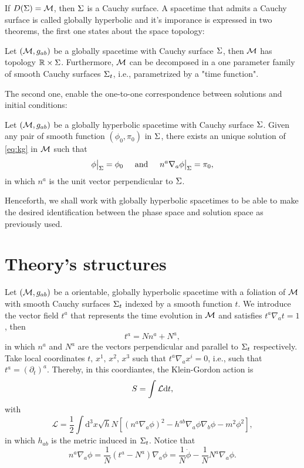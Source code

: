 If \(D(\Sigma)={\mathcal{M}}\), then \(\Sigma\) is a Cauchy surface. A spacetime that admits a Cauchy surface is called globally hyperbolic and it's imporance is expressed in two theorems, the first one states about the space topology:
\begin{theorem}
    Let \(({\mathcal{M}},g_{ab})\) be a globally spacetime with Cauchy surface \(\Sigma\), then \({\mathcal{M}}\) has topology \({\mathbb{R}}\times\Sigma\). Furthermore, \({\mathcal{M}}\) can be decomposed in a one parameter family of smooth Cauchy surfaces \(\Sigma_t\), i.e., parametrized by a "time function".
\end{theorem}

The second one, enable the one-to-one correspondence between solutions and initial conditions:
\begin{theorem}
    Let \(({\mathcal{M}},g_{ab})\) be a globally hyperbolic spacetime with Cauchy surface \(\Sigma\). Given any pair of smooth function \((\phi_0,\pi_0)\) in \(\Sigma\), there exists an unique solution of \cref{eq:kg} in \({\mathcal{M}}\) such that
    \begin{equation}
        \phi\big\vert_{\Sigma}=\phi_0\hspace*{5mm}\text{and}\hspace*{5mm}n^a\nabla_a\phi\big\vert_{\Sigma}=\pi_0,
    \end{equation}
    in which \(n^a\) is the unit vector perpendicular to \(\Sigma\).
\end{theorem}

Henceforth, we shall work with globally hyperbolic spacetimes to be able to make the desired identification between the phase space and solution space as previously used.

\section{Theory's structures}
Let \(({\mathcal{M}},g_{ab})\) be a orientable, globally hyperbolic spacetime with a foliation of \({\mathcal{M}}\) with smooth Cauchy surfaces \(\Sigma_t\) indexed by a smooth function \(t\). We introduce the vector field \(t^a\) that represents the time evolution in \({\mathcal{M}}\) and satisfies \(t^a\nabla_a t=1\), then
\begin{equation}
    t^a=Nn^a+N^a,
\end{equation}
in which \(n^a\) and \(N^a\) are the vectors perpendicular and parallel to \(\Sigma_t\) respectively. Take local coordinates \(t,\,x^1,\,x^2,\,x^3\) such that \(t^a\nabla_a x^i=0\), i.e., such that \(t^a=(\partial_t)^a\). Thereby, in this coordiantes, the Klein-Gordon action is
\begin{equation}
    S=\int{\mathcal{L}}\mathrm{d} t,
\end{equation}
with
\begin{equation}
    \mathcal{L}=\frac{1}{2}\int\mathrm{d}^3x\sqrt{h}N\left[\left(n^a\nabla_a\phi\right)^2-h^{ab}\nabla_a\phi\nabla_b\phi-m^2\phi^2\right],
    \label{eq:density-L}
\end{equation}
in which \(h_{ab}\) is the metric induced in \(\Sigma_t\). Notice that
\begin{equation}
    n^a\nabla_a\phi=\frac{1}{N}(t^a-N^a)\nabla_a\phi=\frac{1}{N}\dot{\phi}-\frac{1}{N}N^a\nabla_a\phi.
\end{equation}

